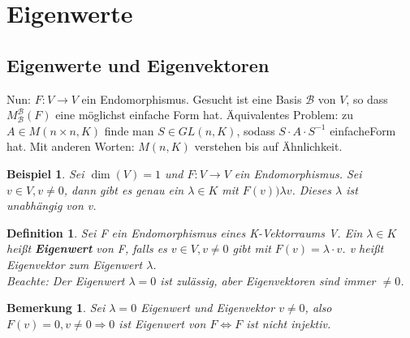 \documentclass[12pt,a4paper]{article}
\theoremstyle{plain}
\newtheorem{Definition}[Theorem]{Definition}
\newtheorem{Bemerkung}[Theorem]{Bemerkung}
\newtheorem{Beispiel}[Theorem]{Beispiel}
\newcommand{\herv}[1]{{\emph{\textbf{#1}}}}
\numberwithin{equation}{section}
\begin{document}
\section{Eigenwerte}
\subsection{Eigenwerte und Eigenvektoren}
Nun: $F: V \rightarrow V$ ein Endomorphismus. Gesucht ist eine Basis $\mathcal{B}$ von $V$, so dass $M^{\mathcal{B}}_\mathcal{B}(F)$ eine möglichst einfache Form hat. Äquivalentes Problem: zu $A\in M(n\times n,K)$ finde man $S\in GL(n,K)$, sodass $S\cdot A\cdot S^{-1}$ \glqq einfache\grqq Form hat. Mit anderen Worten: $M(n,K)$ verstehen bis auf Ähnlichkeit.
\begin{Beispiel} Sei $\dim(V)=1$ und $F:V\rightarrow V$ ein Endomorphismus. Sei $v\in V, v\neq 0$, dann gibt es genau ein $\lambda \in K$ mit $F(v))\lambda v$. Dieses $\lambda$ ist unabhängig von v.
\end{Beispiel}
\begin{Definition} Sei F ein Endomorphismus eines K-Vektorraums V. Ein $\lambda\in K$ heißt \herv{Eigenwert} von F, falls es $v\in V, v\neq 0$ gibt mit $F(v)=\lambda \cdot v$. v heißt Eigenvektor zum Eigenwert $\lambda$.\\
Beachte: Der Eigenwert $\lambda=0$ ist zulässig, aber Eigenvektoren sind immer $\neq 0$.
\end{Definition}
\begin{Bemerkung}
Sei $\lambda=0$ Eigenwert und Eigenvektor $v\neq 0$, also $F(v)=0, v\neq 0\Rightarrow 0$ ist Eigenwert von $F \Leftrightarrow F$ ist nicht injektiv.   
\end{Bemerkung}
\end{document}
